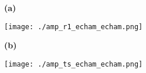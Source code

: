 \documentclass[preview]{standalone}
\begin{document}
\begin{figure}

  \begin{subfigure}[t]{0.06\textwidth}
    \textbf{\Large{(a)}}
  \end{subfigure}
  \begin{subfigure}[t]{0.94\textwidth}
    \texttt{[image: ./amp\_r1\_echam\_echam.png]}
  \end{subfigure}

  \begin{subfigure}[t]{0.06\textwidth}
    \textbf{\Large{(b)}}
  \end{subfigure}
  \begin{subfigure}[t]{0.94\textwidth}
    \texttt{[image: ./amp\_ts\_echam\_echam.png]}
  \end{subfigure}

\end{figure}
\end{document}
